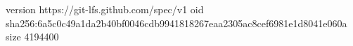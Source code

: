 version https://git-lfs.github.com/spec/v1
oid sha256:6a5c0c49a1da2b40bf0046cdb9941818267eaa2305ac8cef6981e1d8041e060a
size 4194400
